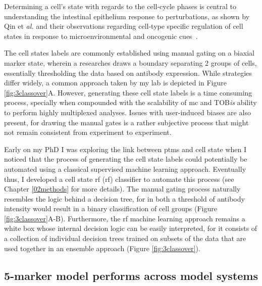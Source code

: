 Determining a cell's state with regards to the cell-cycle phases is central to understanding the intestinal epithelium response to perturbations, as shown by Qin et \emph{al.} and their observations regarding cell-type specific regulation of cell states in response to microenvironmental and oncogenic cues~\cite{qin_cell-type-specific_2020}.

The cell states labels are commonly established using manual gating on a biaxial marker state, wherein a researches draws a boundary separating 2 groups of cells, essentially thresholding the data based on antibody expression. While strategies differ widely, a common approach taken by my lab is depicted in Figure \ref{fig:3classover}A. However, generating these cell state labels is a time consuming process, specially when compounded with the scalability of \acrshort{mc} and TOB\emph{is} ability to perform highly multiplexed analyses. Issues with user-induced biases are also present, for drawing the manual gates is a rather subjective process that might not remain consistent from experiment to experiment.

Early on my PhD I was exploring the link between \acrshort{ptm}s and cell state when I noticed that the process of generating the cell state labels could potentially be automated using a classical supervised machine learning approach. Eventually thus, I developed a cell state \acrlong{rf} (\acrshort{rf}) classifier to automate this process (see Chapter \ref{02methods} for more details). The manual gating process naturally resembles the logic behind a decision tree, for in both a threshold of antibody intensity would result in a binary classification of cell groups (Figure \ref{fig:3classover}A-B). Furthermore, the \acrshort{rf} machine learning approach remains a white box whose internal decision logic can be easily interpreted, for it consists of a collection of individual decision trees trained on subsets of the data that are used together in an ensemble approach (Figure \ref{fig:3classover}).

\subsection{5-marker model performs across model systems}

